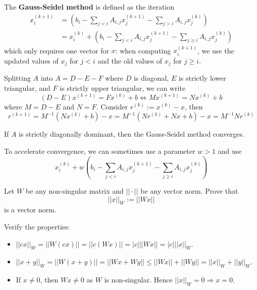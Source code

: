 \begin{definition}
	The \textbf{Gauss-Seidel method} is defined as the iteration
	\[
		\begin{aligned}
			x_i^{(k + 1)}
				& = \left( b_i - \sum_{j < i} A_{i, j} x_j^{(k + 1)} - \sum_{j > i} A_{i, j} x_j^{(k)} \right) \\
				& = x_i^{(k)} + \left( b_i - \sum_{j < i} A_{i, j} x_j^{(k + 1)} - \sum_{j \ge i} A_{i, j} x_j^{(k)} \right)
		\end{aligned}
	\]
	which only requires one vector for $x$: when computing $x_i^{(k + 1)}$, we use the updated values of $x_j$ for $j < i$ and the old values of $x_j$ for $j \ge i$.

	Splitting $A$ into $A = D - E - F$ where $D$ is diagonal, $E$ is strictly lower triangular, and $F$ is strictly upper triangular, we can write
	\[
		(D - E) x^{(k + 1)} = F x^{(k)} + b \Longleftrightarrow M x^{(k + 1)} = N x^{(k)} + b
	\]
	where $M = D - E$ and $N = F$. Consider $r^{(k)} := x^{(k)} - x$, then
	\[
		r^{(k + 1)} = M^{-1} (N x^{(k)} + b) - x = M^{-1} (N r^{(k)} + Nx + b) - x = M^{-1} N r^{(k)}
	\]
\end{definition}

\begin{proposition}
	If $A$ is strictly diagonally dominant, then the Gauss-Seidel method converges.
\end{proposition}

\begin{remark}
	To accelerate convergence, we can sometimes use a parameter $w > 1$ and use
	\[
		x_i^{(k)} + w \left( b_i - \sum_{j < i} A_{i, j} x_j^{(k + 1)} - \sum_{j \ge i} A_{i, j} x_j^{(k)} \right)
	\]
\end{remark}

\begin{example}
	Let $W$ be any non-singular matrix and $||\cdot||$ be any vector norm. Prove that
	\[
		||x||_W := ||Wx||
	\]
	is a vector norm.

	Verify the properties:
	\begin{itemize}
		\item $||cx||_W = ||W(cx)|| = ||c(Wx)|| = |c| ||Wx|| = |c| ||x||_W$.
		\item $||x + y||_W = ||W(x + y)|| = ||Wx + Wy|| \le ||Wx|| + ||Wy|| = ||x||_W + ||y||_W$.
		\item If $x \ne 0$, then $Wx \ne 0$ as $W$ is non-singular. Hence $||x||_W = 0 \Longrightarrow x = 0$.
	\end{itemize}
\end{example}

